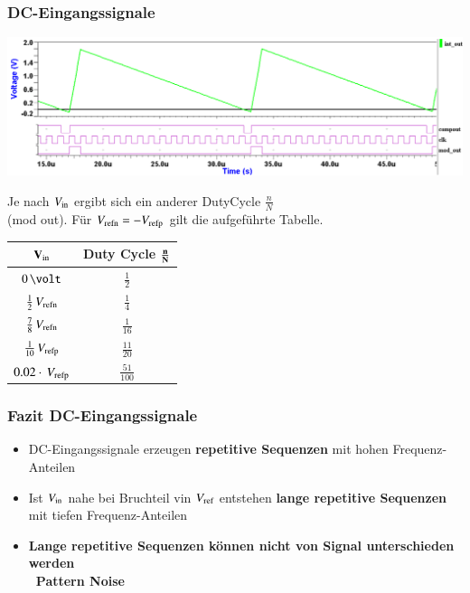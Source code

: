 \subsubsection{DC-Eingangssignale}

\begin{minipage}[c]{0.6\columnwidth}
    \includegraphics[width=\columnwidth]{images/sigma_delta_timing.png}

    Je nach $V_{\rm in}$ ergibt sich ein anderer DutyCycle $\frac{n}{N}$\\
    (mod out). Für $V_{\rm refn} = - V_{\rm refp}$ gilt die aufgeführte Tabelle. 
\end{minipage}
\hfill
\begin{minipage}[c]{0.38\columnwidth}
    \begin{tabular}{c | c}
        $\bf{V_{\rm in}}$               & \textbf{Duty Cycle} $\bf{\frac{n}{N}}$ \\
        \midrule
        $0 \, \volt$                    & $\frac{1}{2}$ \\
        $\frac{1}{2} \, V_{\rm refn}$   & $\frac{1}{4}$ \\
        $\frac{7}{8} \, V_{\rm refn}$   & $\frac{1}{16}$ \\
        $\frac{1}{10} \, V_{\rm refp}$  & $\frac{11}{20}$ \\
        $0.02 \cdot \, V_{\rm refp}$    & $\frac{51}{100}$
    \end{tabular}
\end{minipage}


\subsubsection*{Fazit DC-Eingangssignale}

\begin{itemize}
    \item DC-Eingangssignale erzeugen \textbf{repetitive Sequenzen} mit hohen Frequenz-Anteilen
    \item Ist $V_{\rm in}$ nahe bei Bruchteil vin $V_{\rm ref}$ entstehen \textbf{lange repetitive Sequenzen} mit tiefen Frequenz-Anteilen
    \item \textbf{Lange repetitive Sequenzen können nicht von Signal unterschieden werden\\
        \textrightarrow\ Pattern Noise}
\end{itemize}
        

